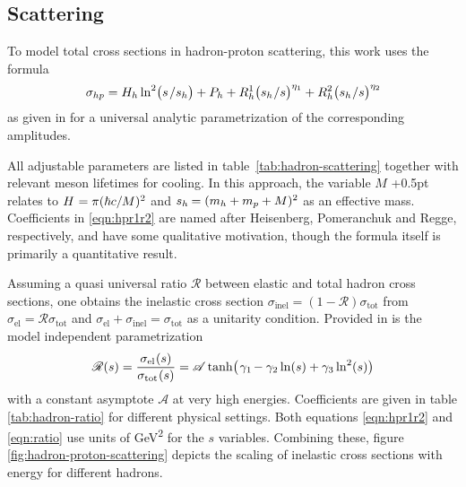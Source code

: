 \subsection{Scattering}
\label{sub:scattering}

To model total cross sections in hadron-proton scattering, this work uses the formula
\begin{equation}
	\sigma_{hp} = H_h \ln^2 \bigl( s \kern+1.0pt / s_h \bigr) + P_h +
	R_h^1 \bigl( s_h \kern+0.5pt / s \bigr)^{\eta_1} + R_h^2 \bigl( s_h \kern+0.5pt / s \bigr)^{\eta_2}
	\label{eqn:hpr1r2}
\end{equation}
as given in \cite{Belousov_2016} for a universal analytic parametrization of the corresponding amplitudes.

All adjustable parameters are listed in table~\ref{tab:hadron-scattering} together with relevant meson lifetimes for
cooling. In this approach, the variable $M$ \kern+0.5pt relates to $H \kern+0.5pt = \pi (\hbar c / M)^2$ and
$s_h \kern-0.5pt = (m_h + m_p + M)^2$ as an effective mass. Coefficients in \eqref{eqn:hpr1r2} are named after Heisenberg,
Pomeranchuk and Regge, respectively, and have some qualitative motivation, though the formula itself is primarily a quantitative
result.



Assuming a quasi universal ratio $\mathscr{R}$ between elastic and total hadron cross sections, one obtains the inelastic
cross section $\sigma_\text{inel} = (1 - \mathscr{R}) \sigma_\text{tot}$ from $\sigma_\text{el} = \mathscr{R} \sigma_\text{tot}$
and $\sigma_\text{el} + \sigma_\text{inel} = \sigma_\text{tot}$ as a unitarity condition. Provided in \cite{Fagundes_2012} is
the model independent parametrization
\begin{equation}
	\mathscr{R}(s) = \frac{\sigma_{\text{el}\kern+0.5pt} (s)}{\sigma_{\text{tot}\kern+0.5pt} (s)} =
	\mathscr{A} \tanh \bigl( \kern+1.0pt \gamma_1 \kern-1.0pt - \gamma_2 \ln (s) + \gamma_3 \ln^2 (s) \bigr)
	\label{eqn:ratio}
\end{equation}
with a constant asymptote $\mathscr{A}$ at very high energies. Coefficients are given in table \ref{tab:hadron-ratio} for
different physical settings. Both equations \eqref{eqn:hpr1r2} and \eqref{eqn:ratio} use units of \unit{\giga\electronvolt\squared}
for the $s$  variables. Combining these, figure \ref{fig:hadron-proton-scattering} depicts the scaling of inelastic cross sections
with energy for different hadrons.

